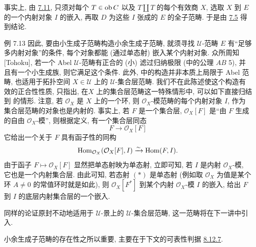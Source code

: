 事实上, 由 \hyperref[I.cor7.11]{7.11},
只须对每个 $T\in \operatorname{ob} C$ 以及 $T\amalg T$ 的每个有效商 $X$,
选取 $X$ 到 $E$ 的一个内射对象 $I$ 的嵌入,
再取 $D$ 为这些 $I$ 张成的 $E$ 的全子范畴.
于是由 \hyperref[I.cor7.5]{7.5} 得到结论.

\begin{enonce*}[remark]{例 7.13}
因此, 要由小生成子范畴构造小余生成子范畴,
就须寻找 $𝒰$-范畴 $E$ 有“足够多内射对象”的条件,
\ie 每个对象都能 (通过单态射) 嵌入某个内射对象.
众所周知 [Tohoku], 若一个 Abel $𝒰$-范畴有正合的 (小) 滤过归纳极限
(\loccit 中的公理 $AB$ 5), 并且有一个小生成族, 则它满足这个条件.
此外, \loccit 中的构造并非本质上局限于 Abel 范畴,
也适用于拓扑空间 $X\in 𝒰$ 上的 $𝒰$-集合层范畴.
我们不在此陈述使这个构造有效的正合性性质,
只指出, 在\pageoriginale $X$ 上的集合层范畴这一特殊情形中,
可以如下直接归结到 \loccit 的情形.
注意, 若 $\mathcal{O}_X$ 是 $X$ 上的一个环,
则 $\mathcal{O}_X$-模范畴的每个内射对象 $I$,
作为集合层范畴的对象也是内射的.
事实上, 若 $F$ 是一个集合层,
$\mathcal{O}_X[F]$ 是“由 $F$ 生成的自由 $\mathcal{O}_X$-模”,
则根据定义, 有一个集合层同态
\begin{equation*}
F\longrightarrow \mathcal{O}_X[F]\tag{$\ast$}
\end{equation*}
它给出一个关于 $F$ 具有函子性的同构
$$
\operatorname{Hom}_{\mathcal{O}_X}(\mathcal{O}_X[F], I)\xrightarrow{\sim} \operatorname{Hom}
(F,I){}.
$$
由于函子 $F\mapsto \mathcal{O}_X[F]$ 显然把单态射映为单态射,
立即可知, 若 $I$ 是内射 $\mathcal{O}_X$-模,
它也是一个内射集合层.
由此可知, 若态射 $(\ast)$ 是单态射
(例如取 $\mathcal{O}_X$ 为值是某个环 $A\neq 0$ 的常值环时就是如此),
则 $\mathcal{O}_X[F^\ast]$ 到某个内射 $\mathcal{O}_X$-模 $I$ 的嵌入,
给出 $F$ 到 $I$ 的底层内射集合层的一个嵌入.
\end{enonce*}

同样的论证原封不动地适用于 $𝒰$-景上的 $𝒰$-集合层范畴,
这一范畴将在下一讲中引入.

小余生成子范畴的存在性之所以重要,
主要在于下文的可表性判据 \hyperref[I.cor8.12.7]{8.12.7}.

\setcounter{section}{7}



